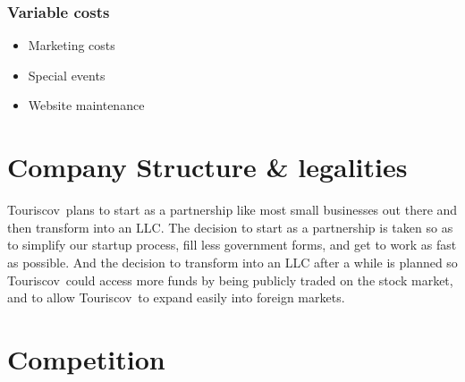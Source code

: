 \documentclass[12pt]{article}
\newcommand{\tco}{Touriscov}
\begin{document}
\subsubsection{Variable costs}
\begin{itemize}
    \item Marketing costs
    \item Special events
    \item Website maintenance
\end{itemize}

\section{Company Structure \& legalities}
\tco\ plans to start as a partnership like most small businesses out there and then transform into an LLC\@. The decision to start as a partnership is taken so as to simplify our startup process, fill less government forms, and get to work as fast as possible. And the decision to transform into an LLC after a while is planned so \tco\ could access more funds by being publicly traded on the stock market, and to allow \tco\ to expand easily into foreign markets.

\section{Competition}

\noindent
\end{document}
